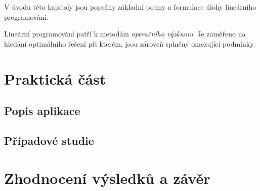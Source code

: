 \documentclass[a4paper, 12pt]{report}
\begin{document}
V úvodu této kapitoly jsou popsány základní pojmy a formulace úlohy lineárního programování.

Lineární programování patří k metodám \textit{operačního výzkumu}.
Je zaměřeno na hledání optimálního řešení při kterém, jsou zároveň splněny omezující podmínky.


\renewcommand{\chaptername}{Praktická část}
\chapter{Praktická část}

\section{Popis aplikace}



\section{Případové studie}

\renewcommand{\chaptername}{Zhodnocení výsledků a závěr}
\chapter{Zhodnocení výsledků a závěr}



\end{document}
